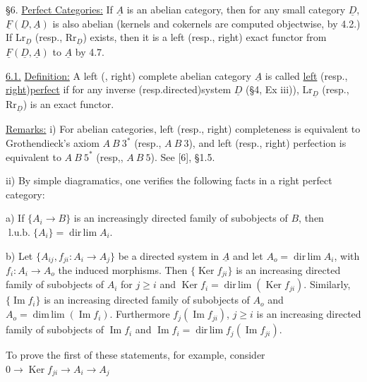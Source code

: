 
\S 6. \uline{Perfect Categories:} If $\underline{A}$ is an abelian category, then
for any small category $\underline{D}$, $\underline{F}(\underline{D},\underline{A})$ is also abelian (kernels
and cokernels are computed objectwise, by 4.2.) If $\mathrm{Lr}_{\underline{D}}$
(resp., $\mathrm{Rr}_{\underline{D}}$) exists, then it is a left (resp., right) exact
functor from $\underline{F}(\underline{D},\underline{A})$ to $\underline{A}$ by 4.7.

\uline{6.1.} \uline{Definition:} A left (\uline{}, right) complete abelian
category $\underline{A}$ is called \uline{left} (resp., \uline{right})\uline{perfect} if for any inverse
(resp.directed)system $\underline{D}$ (\S 4, Ex iii)), $\mathrm{Lr}_{\underline{D}}$ (resp., $\mathrm{Rr}_{\underline{D}}$) is an exact
functor.

\uline{Remarks:} i) For abelian categories, left (resp., right)
completeness is equivalent to Grothendieck's axiom $A\ B\ 3^*$
(resp., $A\ B\ 3$), and left (resp., right) perfection is equivalent
to $A\ B\ 5^*$ (resp,, $A\ B\ 5$). See [6], \S 1.5.

ii) By simple diagramatics, one verifies the following
facts in a right perfect category:

a) If $\{A_i\longrightarrow B\}$ is an increasingly directed family of
subobjects of $B$, then $\operatorname{l.u.b.}\{A_i\}=\operatorname{dir\,lim}A_i$.

b) Let $\{A_{ij},f_{ji}:A_i\longrightarrow A_j\}$ be a directed system in $\underline{A}$
and let $A_o=\operatorname{dir\,lim}A_i$, with $f_i:A_i\longrightarrow A_o$ the induced morphisms.
Then $\{\operatorname{Ker}f_{ji}\}$ is an increasing directed family of subobjects
of $A_i$ for $j\geq i$ and $\operatorname{Ker}f_i=\operatorname{dir\,lim}(\operatorname{Ker}f_{ji})$. Similarly,
$\{\operatorname{Im}f_i\}$ is an increasing directed family of subobjects of
$A_o$ and $A_o=\operatorname{dim\,lim}(\operatorname{Im}f_i)$. Furthermore $f_j(\operatorname{Im}f_{ji})$, $j\geq i$ is
an increasing directed family of subobjects of $\operatorname{Im}f_i$ and
$\operatorname{Im}f_i=\operatorname{dir\,lim}f_j(\operatorname{Im}f_{ji})$.

To prove the first of these statements, for example,
consider $0\longrightarrow\operatorname{Ker}f_{ji}\longrightarrow A_i\longrightarrow A_j$
